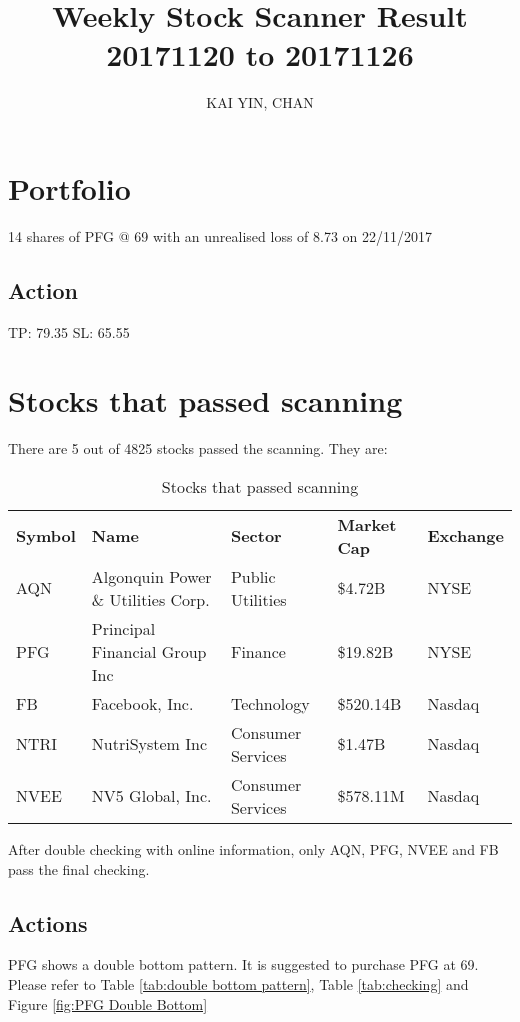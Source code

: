 \documentclass{article}
\begin{document}
\title{Weekly Stock Scanner Result \\ 20171120 to 20171126}
\author{KAI YIN, CHAN}
\maketitle

\section{Portfolio}
14 shares of PFG @ 69 with an unrealised loss of 8.73 on 22/11/2017

\subsection{Action}
TP: 79.35 SL: 65.55

\section{Stocks that passed scanning}

There are 5 out of 4825 stocks passed the scanning.  They are:
\begin{table}[htbp]
  \caption{Stocks that passed scanning}
    \begin{tabular}{lllll}
    \textbf{Symbol} & \textbf{Name} & \textbf{Sector} & \textbf{Market Cap} & \textbf{Exchange} \\
    AQN   & Algonquin Power \& Utilities Corp. & Public Utilities & \$4.72B & NYSE \\
    PFG   & Principal Financial Group Inc & Finance & \$19.82B & NYSE \\
    FB    & Facebook, Inc. & Technology & \$520.14B & Nasdaq \\
    NTRI  & NutriSystem Inc & Consumer Services & \$1.47B & Nasdaq \\
    NVEE  & NV5 Global, Inc. & Consumer Services & \$578.11M & Nasdaq \\
    \end{tabular}%
  \label{tab:addlabel}%
\end{table}%

After double checking with online information, only AQN, PFG, NVEE and FB pass the final checking.

\subsection{Actions}
PFG shows a double bottom pattern. It is suggested to purchase PFG at 69. Please refer to Table \ref{tab:double bottom pattern}, Table \ref{tab:checking} and Figure \ref{fig:PFG Double Bottom}
\end{document}
